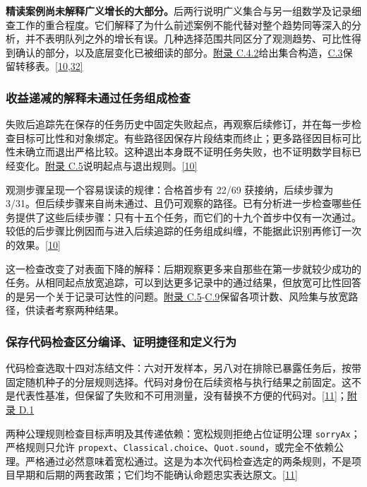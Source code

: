\textbf{精读案例尚未解释广义增长的大部分。}后两行说明广义集合与另一组数学及记录细查工作的重合程度。它们解释了为什么前述案例不能代替对整个趋势同等深入的分析，并不表明队列之外的增长有误。几种选择范围共同区分了观测趋势、可比性得到确认的部分，以及底层变化已被细读的部分。\href{zh-appendix.pdf\#c4-2}{附录 C.4.2}给出集合构造，\href{zh-appendix.pdf\#c3}{C.3}保留转移表。\href{zh.pdf\#ref-10}{\mbox{[10,32]}}

\subsubsection[收益递减的解释未通过任务组成检查]{\texorpdfstring{\protect\hypertarget{r3-6}{}收益递减的解释未通过任务组成检查}{收益递减的解释未通过任务组成检查}}
失败后追踪先在保存的任务历史中固定失败起点，再观察后续修订，并在每一步检查目标可比性和对象绑定。有些路径因保存片段结束而终止；更多路径因目标可比性未确立而退出严格比较。这种退出本身既不证明任务失败，也不证明数学目标已经变化。\href{zh-appendix.pdf\#c5}{附录 C.5}说明起点与退出规则。\href{zh.pdf\#ref-10}{\mbox{[10]}}

观测步骤呈现一个容易误读的规律：合格首步有 22/69 获接纳，后续步骤为 3/31。但后续步骤来自尚未通过、且仍可观察的路径。已有分析进一步检查哪些任务提供了这些后续步骤：只有十五个任务，而它们的十九个首步中仅有一次通过。较低的后步骤比例因而与进入后续追踪的任务组成纠缠，不能据此识别再修订一次的效果。\href{zh.pdf\#ref-10}{\mbox{[10]}}

这一检查改变了对表面下降的解释：后期观察更多来自那些在第一步就较少成功的任务。从相同起点放宽追踪，可以到达更多记录中的通过结果，但放宽可比性回答的是另一个关于记录可达性的问题。\href{zh-appendix.pdf\#c5}{附录 C.5}-\href{zh-appendix.pdf\#c9}{C.9}保留各项计数、风险集与放宽路径，供读者考察两种结果。

\subsubsection[保存代码检查区分编译、证明捷径和定义行为]{\texorpdfstring{\protect\hypertarget{r3-7}{}保存代码检查区分编译、证明捷径和定义行为}{保存代码检查区分编译、证明捷径和定义行为}}
代码检查选取十四对冻结文件：六对开发样本，另八对在排除已暴露任务后，按带固定随机种子的分层规则选择。代码对身份在后续资格与执行结果之前固定。这不是代表性基准，但保留了失败和不可用测量，没有替换不方便的代码对。\href{zh.pdf\#ref-11}{\mbox{[11]}}；\href{zh-appendix.pdf\#d1}{附录 D.1}

两种公理规则检查目标声明及其传递依赖：宽松规则拒绝占位证明公理 \nolinkurl{sorryAx}；严格规则只允许 \nolinkurl{propext}、\nolinkurl{Classical.choice}、\nolinkurl{Quot.sound}，或完全不依赖公理。严格通过必然意味着宽松通过。这是为本次代码检查选定的两条规则，不是项目早期和后期的两套政策；它们均不能确认命题忠实表达原文。\href{zh.pdf\#ref-11}{\mbox{[11]}}

